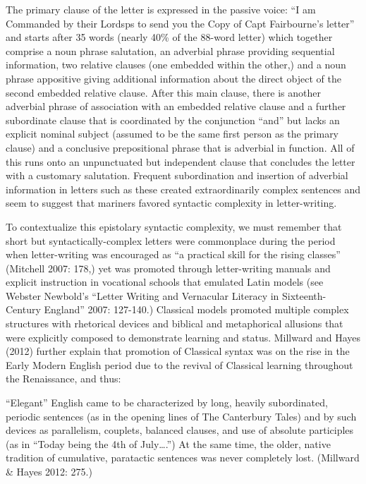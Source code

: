 \begin{styleStandard}
The primary clause of the letter is expressed in the passive voice: “I am Commanded by their Lordsps to send you the Copy of Capt Fairbourne’s letter” and starts after 35 words (nearly 40\% of the 88-word letter) which together comprise a noun phrase salutation, an adverbial phrase providing sequential information, two relative clauses (one embedded within the other,) and a noun phrase appositive giving additional information about the direct object of the second embedded relative clause. After this main clause, there is another adverbial phrase of association with an embedded relative clause and a further subordinate clause that is coordinated by the conjunction “and” but lacks an explicit nominal subject (assumed to be the same first person as the primary clause) and a conclusive prepositional phrase that is adverbial in function. All of this runs onto an unpunctuated but independent clause that concludes the letter with a customary salutation. Frequent subordination and insertion of adverbial information in letters such as these created extraordinarily complex sentences and seem to suggest that mariners favored syntactic complexity in letter-writing. \ 
\end{styleStandard}

\begin{styleStandard}
To contextualize this epistolary syntactic complexity, we must remember that short but syntactically-complex letters were commonplace during the period when letter-writing was encouraged as “a practical skill for the rising classes” (Mitchell 2007: 178,) yet was promoted through letter-writing manuals and explicit instruction in vocational schools that emulated Latin models (see Webster Newbold’s “Letter Writing and Vernacular Literacy in Sixteenth-Century England” 2007: 127-140.) Classical models promoted multiple complex structures with rhetorical devices and biblical and metaphorical allusions that were explicitly composed to demonstrate learning and status. Millward and Hayes (2012) further explain that promotion of Classical syntax was on the rise in the Early Modern English period due to the revival of Classical learning throughout the Renaissance, and thus:
\end{styleStandard}

\begin{styleStandard}
“Elegant” English came to be characterized by long, heavily subordinated, periodic sentences (as in the opening lines of The Canterbury Tales) and by such devices as parallelism, couplets, balanced clauses, and use of absolute participles (as in “Today being the 4th of July….”) At the same time, the older, native tradition of cumulative, paratactic sentences was never completely lost. (Millward \& Hayes 2012: 275.)
\end{styleStandard}

